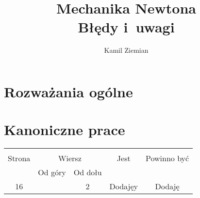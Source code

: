 \documentclass[a4paper,11pt]{article}
\title{Mechanika Newtona \\
  {\Large Błędy i~uwagi}}
\author{Kamil Ziemian}
\begin{document}





\maketitle %





\section{Rozważania ogólne}

\vspace{\spaceTwo}







\section{Kanoniczne prace}

\vspace{\spaceTwo}







\begin{center}

  \begin{tabular}{|c|c|c|c|c|}
    \hline
    & \multicolumn{2}{c|}{} & & \\
    Strona & \multicolumn{2}{c|}{Wiersz} & Jest
                              & Powinno być \\ \cline{2-3}
    & Od góry & Od dołu & & \\
    \hline
    16  & &  2 & Dodajęy & Dodaję \\
    \hline
  \end{tabular}

\end{center}
\end{document}
